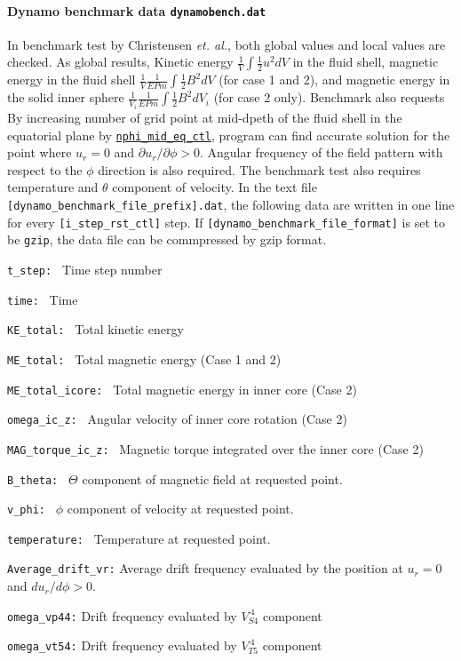 \paragraph{Dynamo benchmark data {\tt dynamobench.dat}}
 In benchmark test by Christensen {\it et. al.}, both global values and local values are checked. As global results, Kinetic energy 
 $\displaystyle{ \frac{1}{V} \int \frac{1}{2} u^{2} dV}$ in the fluid shell, magnetic energy in the fluid shell 
 $\displaystyle{ \frac{1}{V} \frac{1}{E Pm} \int \frac{1}{2} B^{2} dV}$ (for case 1 and 2), and magnetic energy in the solid inner sphere 
 $\displaystyle{ \frac{1}{V_{i}} \frac{1}{E Pm} \int \frac{1}{2} B^{2} dV_{i}}$ (for case 2 only). Benchmark also requests 
 By increasing number of grid point at mid-dpeth of the fluid shell in the equatorial plane by \hyperref[href_t:nphi_mid_eq_ctl]{{\tt nphi\_mid\_eq\_ctl}}, program can find accurate solution for the point where $u_{r} = 0$ and $\partial u_{r} / \partial \phi > 0$. Angular frequency of the field pattern with respect to the $\phi$ direction is also required. The benchmark test also requires temperature and $\theta$ component of velocity. In the text file {\tt [dynamo\_benchmark\_file\_prefix].dat}, the following data are written in one line for every \verb|[i_step_rst_ctl]| step. If {\tt [dynamo\_benchmark\_file\_format]} is set to be {\tt gzip}, the data file can be commpressed by gzip format.
%
\begin{description}
\item{\tt t\_step:  }  Time step number
\item{\tt time:     }  Time
\item{\tt KE\_total: }  Total kinetic energy
\item{\tt ME\_total: }  Total magnetic energy  (Case 1 and 2)
\item{\tt ME\_total\_icore: }  Total magnetic energy in inner core (Case 2)
\item{\tt omega\_ic\_z: } Angular velocity of inner core rotation (Case 2)
\item{\tt MAG\_torque\_ic\_z: }  Magnetic torque integrated over the inner core (Case 2)
\item{\tt B\_theta: } $\Theta$ component of magnetic field at requested point.
\item{\tt v\_phi: } $\phi$ component of velocity at requested point.
\item{\tt temperature: } Temperature at requested point.
\item{\tt Average\_drift\_vr:} Average drift frequency evaluated by the position at $u_{r} = 0$ and $d u_{r} / d \phi > 0$.
\item{\tt omega\_vp44:} Drift frequency evaluated by $V_{S4}^{\ 4}$ component
\item{\tt omega\_vt54:} Drift frequency evaluated by $V_{T5}^{\ 4}$ component


\end{description}

